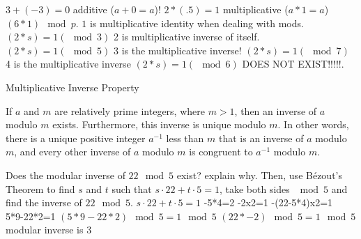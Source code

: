 \begin{exmp}
$3+(-3)=0$ additive ($a+0=a$)!
\newline
$2*(.5)=1$ multiplicative ($a*1=a$)
\newline
$(6*1)\mod p$. $1$ is multiplicative identity when dealing with mods.
\newline
$(2*s)=1 (\mod 3)$ 2 is multiplicative inverse of itself.
\newline
$(2*s)=1 (\mod 5)$ 3 is the multiplicative inverse!
\newline
$(2*s)=1 (\mod 7)$ 4 is the multiplicative inverse
\newline
$(2*s)=1 (\mod 6)$ DOES NOT EXIST!!!!!.
\newline

\end{exmp}
\begin{thm}{Multiplicative Inverse Property}

If $a$ and $m$ are relatively prime integers, where $m > 1$, then an inverse of $a$ modulo $m$ exists. Furthermore, this inverse is unique modulo $m$. In other words, there is a unique positive integer $a^{-1}$ less than $m$ that is an inverse of $a$ modulo $m$, and every other inverse of $a$ modulo $m$ is congruent to $a^{-1}$ modulo $m$.

\end{thm}
\begin{exmp} Does the modular inverse of $22 \mod 5$ exist? explain why. Then, use Bézout's Theorem to find $s$ and $t$ such that $s\cdot 22+t\cdot 5=1$, take both sides $\mod 5$ and find the inverse of $22 \mod 5$.
\newline
$s\cdot22+t\cdot 5=1$
-5*4=2
-2x2=1
-(22-5*4)x2=1
\newline $ $\\
5*9-22*2=1
\newline
$(5*9-22*2)\mod 5=1\mod 5$
\newline
$(22*-2)\mod 5=1\mod 5$
\newline
modular inverse is $3$
\newline


\end{exmp}



\newpage
